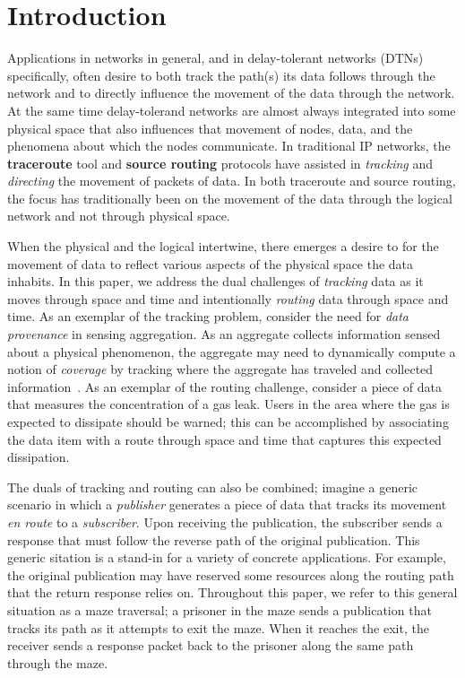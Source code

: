 %
%
\section{Introduction}
Applications in networks in general, and in delay-tolerant networks (DTNs) specifically, often desire to both track the path(s) its data follows through the network and to directly influence the movement of the data through the network. At the same time delay-tolerand networks are almost always integrated into some physical space that also influences that movement of nodes, data, and the phenomena about which the nodes communicate. In traditional IP networks, the {\bf traceroute} tool and {\bf source routing} protocols have assisted in {\em tracking} and {\em directing} the movement of packets of data. In both traceroute and source routing, the focus has traditionally been on the movement of the data through the logical network and not through physical space.

When the physical and the logical intertwine, there emerges a desire to for the movement of data to reflect various aspects of the physical space the data inhabits. In this paper, we address the dual challenges of {\em tracking} data as it moves through space and time and intentionally {\em routing} data through space and time. As an exemplar of the tracking problem, consider the need for {\em data provenance} in sensing aggregation. As an aggregate collects information sensed about a physical phenomenon, the aggregate may need to dynamically compute a notion of {\em coverage} by tracking where the aggregate has traveled and collected information~\cite{jonas-paper}. As an exemplar of the routing challenge, consider a piece of data that measures the concentration of a gas leak. Users in the area where the gas is expected to dissipate should be warned; this can be accomplished by associating the data item with a route through space and time that captures this expected dissipation. 

The duals of tracking and routing can also be combined; imagine a generic scenario in which a {\em publisher} generates a piece of data that tracks its movement {\em en route} to a {\em subscriber}. Upon receiving the publication, the subscriber sends a response that must follow the reverse path of the original publication. This generic sitation is a stand-in for a variety of concrete applications. For example, the original publication may have reserved some resources along the routing path that the return response relies on. Throughout this paper, we refer to this general situation as a maze traversal; a prisoner in the maze sends a publication that tracks its path as it attempts to exit the maze. When it reaches the exit, the receiver sends a response packet back to the prisoner along the same path through the maze.

